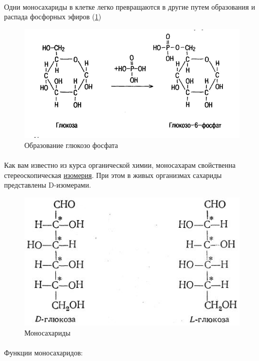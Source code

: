 \paragraph*{}Одни моносахариды в клетке легко превращаются в другие путем образования и распада фосфорных эфиров (\ris \ref{glucfos})

\begin{figure}[h!]
  \centering
       \includegraphics[width=0.5\linewidth]{pictures/glucfos}
\caption{Образование глюкозо фосфата}
\label{glucfos}
\end{figure}

\paragraph*{}Как вам известно из курса органической химии, моносахарам свойственна стереоскопическая \hyperlink{question_isomeria_gluc}{изомерия}. При этом в живых организмах сахариды представлены D-изомерами.

\begin{figure}[h!]
  \centering
       \includegraphics[width=0.5\linewidth]{pictures/dlgluk}
\caption{Моносахариды}
\label{monogluc}
\end{figure}

\paragraph*{}Функции моносахаридов:


